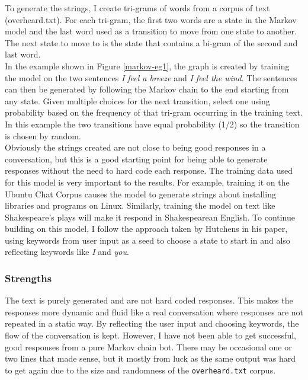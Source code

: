 \documentclass{article}
\newcommand{\n}[0]{\\[\baselineskip]}
\begin{document}
To generate the strings, I create tri-grams of words from a corpus of text (overheard.txt). For each tri-gram, the first two words are a state in the Markov model and the last word used as a transition to move from one state to another. The next state to move to is the state that contains a bi-gram of the second and last word.
\n
In the example shown in Figure \ref{markov-eg1}, the graph is created by training the model on the two sentences \textit{I feel a breeze} and \textit{I feel the wind}. The sentences can then be generated by following the Markov chain to the end starting from any state. Given multiple choices for the next transition, select one using probability based on the frequency of that tri-gram occurring in the training text. In this example the two transitions have equal probability (1/2) so the transition is chosen by random.
\n
Obviously the strings created are not close to being good responses in a conversation, but this is a good starting point for being able to generate responses without the need to hard code each response. The training data used for this model is very important to the results. For example, training it on the Ubuntu Chat Corpus causes the model to generate strings about installing libraries and programs on Linux. Similarly, training the model on text like Shakespeare's plays will make it respond in Shakespearean English. To continue building on this model, I follow the approach taken by Hutchens \cite{cheating} in his paper, using keywords from user input as a seed to choose a state to start in and also reflecting keywords like \textit{I} and \textit{you}.
\subsubsection{Strengths}
The text is purely generated and are not hard coded responses. This makes the responses more dynamic and fluid like a real conversation where responses are not repeated in a static way. By reflecting the user input and choosing keywords, the flow of the conversation is kept. However, I have not been able to get successful, good responses from a pure Markov chain bot. There may be occasional one or two lines that made sense, but it mostly from luck as the same output was hard to get again due to the size and randomness of the \texttt{overheard.txt} corpus.
\end{document}
